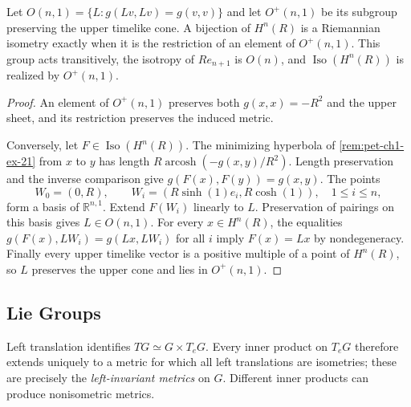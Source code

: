 \begin{example}
  \label{ex:pet-ch1-isometry-group-hyperbolic}
  \leanok
  Let
  $O(n,1)=\{L:g(Lv,Lv)=g(v,v)\}$ and let $O^+(n,1)$ be its subgroup preserving
  the upper timelike cone. A bijection of $H^n(R)$ is a Riemannian isometry
  exactly when it is the restriction of an element of $O^+(n,1)$. This group
  acts transitively, the isotropy of $Re_{n+1}$ is $O(n)$, and
  $\operatorname{Iso}(H^n(R))$ is realized by $O^+(n,1)$.
\end{example}
\begin{proof}
  \leanok
  \sketch
  An element of $O^+(n,1)$ preserves both $g(x,x)=-R^2$ and the upper sheet,
  and its restriction preserves the induced metric.

  Conversely, let $F\in\operatorname{Iso}(H^n(R))$. The minimizing hyperbola
  of \cref{rem:pet-ch1-ex-21} from $x$ to $y$ has length
  $R\operatorname{arcosh}(-g(x,y)/R^2)$. Length preservation and the inverse
  comparison give $g(F(x),F(y))=g(x,y)$.
  The points
  \[
    W_0=(0,R),\qquad
    W_i=(R\sinh(1)e_i,R\cosh(1)),\quad 1\le i\le n,
  \]
  form a basis of $\mathbb{R}^{n,1}$. Extend $F(W_i)$ linearly to $L$.
  Preservation of pairings on this basis gives $L\in O(n,1)$. For every
  $x\in H^n(R)$, the equalities
  $g(F(x),LW_i)=g(Lx,LW_i)$ for all $i$ imply $F(x)=Lx$ by nondegeneracy.
  Finally every upper timelike vector is a positive multiple of a point of
  $H^n(R)$, so $L$ preserves the upper cone and lies in $O^+(n,1)$.
\end{proof}

\subsection{Lie Groups}

\begin{definition}
  \label{def:pet-ch1-left-invariant-metric}
  \leanok
  Left translation identifies $TG\simeq G\times T_eG$. Every inner product on
  $T_eG$ therefore extends uniquely to a metric for which all left translations
  are isometries; these are precisely the \emph{left-invariant metrics} on $G$.
  Different inner products can produce nonisometric metrics.
\end{definition}

